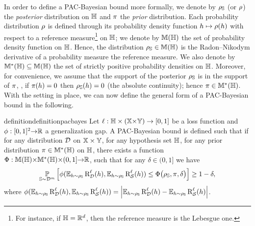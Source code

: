 In order to define a PAC-Bayesian bound more formally, we denote by $\AQ$ (or $\Q$) the {\it posterior} distribution on $\H$ and $\P$ the {\it prior} distribution.
Each probability distribution $\Q$ is defined through its probability density function $\h \mapsto \Q(\h)$ with respect to a reference measure\footnote{For instance, if $\H=\Rbb^{d}$, then the reference measure is the Lebesgue one.} on $\H$; we denote by $\M(\H)$ the set of probability density function on $\H$.
Hence, the distribution $\AQ\in\M(\H)$ is the Radon–Nikodym derivative of a probability measure \wrt the reference measure.
We also denote by $\M^{*}(\H)\subseteq\M(\H)$ the set of strictly positive probability densities on $\H$.
Moreover, for convenience, we assume that the support of the posterior $\AQ$ is in the support of $\P$, \ie, if $\P(\h)=0$ then $\AQ(\h)=0$ (the absolute continuity); hence $\P\in\M^{*}(\H)$.\\

With the setting in place, we can now define the general form of a PAC-Bayesian bound in the following.

\begin{restatable}{definition}{definitionpacbayes}\label{chap:pac-bayes:def:pac-bayes}
Let $\loss: \H \times(\X{\times}\Y)\rightarrow [0,1]$ be a loss function and $\phi: [0,1]^2{\to}\Rbb$ a generalization gap. 
A PAC-Bayesian bound is defined such that if for any distribution $\D$ on $\X\times\Y$, for any hypothesis set $\H$, for any prior distribution $\P\in\M^{*}(\H)$ on $\H$, there exists a function $\Phi: \M(\H){\times}\M^{*}(\H){\times}(0,1]{\to} \Rbb$, such that for any $\delta\in(0, 1]$ we have 
\begin{align*}
    \PP_{\S\sim\D^\m}\LB \phi({\textstyle\EE_{\h\sim\AQ}\RiskLoss_{\D}(\h)}, {\textstyle\EE_{\h\sim\AQ}\RiskLoss_{\dS}(\h)}) \le \Phi\big(\AQ, \P, \delta\big) \RB \ge 1-\delta,
\end{align*}
where \eg $\phi({\textstyle\EE_{\h\sim\AQ}\RiskLoss_{\D}(\h)}, {\textstyle\EE_{\h\sim\AQ}\RiskLoss_{\dS}(\h)}) = \LN\EE_{\h\sim\AQ}\RiskLoss_{\D}(\h)-\EE_{\h\sim\AQ}\RiskLoss_{\dS}(\h)\RN$.
\end{restatable}

